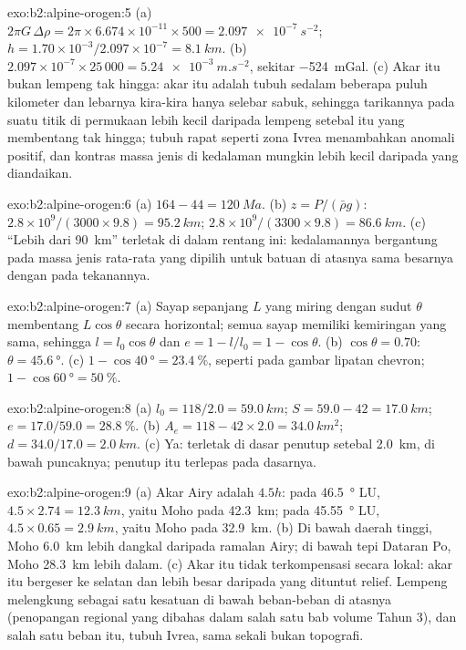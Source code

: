 \begin{solution}{exo:b2:alpine-orogen:5}
(a) $2\pi G\,\Delta\rho = 2\pi\times6.674\times10^{-11}\times500 =
\qty{2.097e-7}{s^{-2}}$; $h = 1.70\times10^{-3}/2.097\times10^{-7} = \qty{8.1}{km}$.
(b) $2.097\times10^{-7}\times25\,000 = \qty{5.24e-3}{m.s^{-2}}$, sekitar
\qty{-524}{mGal}. (c) Akar itu bukan lempeng tak hingga: akar itu adalah tubuh sedalam beberapa puluh kilometer
dan lebarnya kira-kira hanya selebar sabuk, sehingga tarikannya pada suatu titik di permukaan lebih kecil daripada
lempeng setebal itu yang membentang tak hingga; tubuh rapat seperti zona Ivrea
menambahkan anomali positif, dan kontras massa jenis di kedalaman mungkin lebih kecil daripada yang diandaikan.
\end{solution}

\begin{solution}{exo:b2:alpine-orogen:6}
(a) $164 - 44 = \qty{120}{Ma}$. (b) $z = P/(\bar\rho g)$:
$2.8\times10^9/(3000\times9.8) = \qty{95.2}{km}$; $2.8\times10^9/(3300\times9.8) =
\qty{86.6}{km}$. (c) ``Lebih dari \qty{90}{km}'' terletak di dalam rentang ini: kedalamannya bergantung pada
massa jenis rata-rata yang dipilih untuk batuan di atasnya sama besarnya dengan pada tekanannya.
\end{solution}

\begin{solution}{exo:b2:alpine-orogen:7}
(a) Sayap sepanjang $L$ yang miring dengan sudut $\theta$ membentang $L\cos\theta$ secara horizontal; semua sayap
memiliki kemiringan yang sama, sehingga $l = l_0\cos\theta$ dan $e = 1 - l/l_0 = 1 - \cos\theta$.
(b) $\cos\theta = 0.70$: $\theta = \qty{45.6}{\degree}$. (c) $1 - \cos\qty{40}{\degree} =
\qty{23.4}{\percent}$, seperti pada gambar lipatan chevron; $1 - \cos\qty{60}{\degree}
= \qty{50}{\percent}$.
\end{solution}

\begin{solution}{exo:b2:alpine-orogen:8}
(a) $l_0 = 118/2.0 = \qty{59.0}{km}$; $S = 59.0 - 42 = \qty{17.0}{km}$; $e = 17.0/59.0 =
\qty{28.8}{\percent}$. (b) $A_e = 118 - 42\times2.0 = \qty{34.0}{km^2}$; $d = 34.0/17.0 =
\qty{2.0}{km}$. (c) Ya:  terletak di dasar penutup setebal \qty{2.0}{km}, di bawah
puncaknya; penutup itu terlepas pada dasarnya.
\end{solution}

\begin{solution}{exo:b2:alpine-orogen:9}
(a) Akar Airy adalah $4.5h$: pada \qty{46.5}{\degree} LU, $4.5\times2.74 = \qty{12.3}{km}$, yaitu
Moho pada \qty{42.3}{km}; pada \qty{45.55}{\degree} LU, $4.5\times0.65 = \qty{2.9}{km}$, yaitu Moho
pada \qty{32.9}{km}. (b) Di bawah daerah tinggi, Moho \qty{6.0}{km} lebih dangkal daripada ramalan
Airy; di bawah tepi Dataran Po, Moho \qty{28.3}{km} lebih dalam. (c) Akar itu tidak
terkompensasi secara lokal: akar itu bergeser ke selatan dan lebih besar daripada yang dituntut relief.
Lempeng melengkung sebagai satu kesatuan di bawah beban-beban di atasnya (penopangan regional yang dibahas dalam salah satu bab volume
Tahun 3), dan salah satu beban itu, tubuh Ivrea, sama sekali bukan topografi.
\end{solution}

